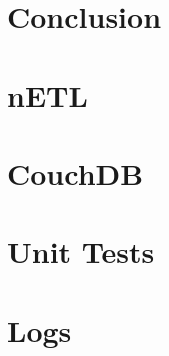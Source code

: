 \documentclass[
    a4paper,
    12pt
]{extreport}
\begin{document}



\chapter{Conclusion}



\newpage

\printbibliography[title=References]

\begin{appendices}
    \chapter{nETL}
    
    
    \chapter{CouchDB}
    
    \chapter{Unit Tests}
    \label{unit-tests}
    
    \chapter{Logs}
    
\end{appendices}

\end{document}
